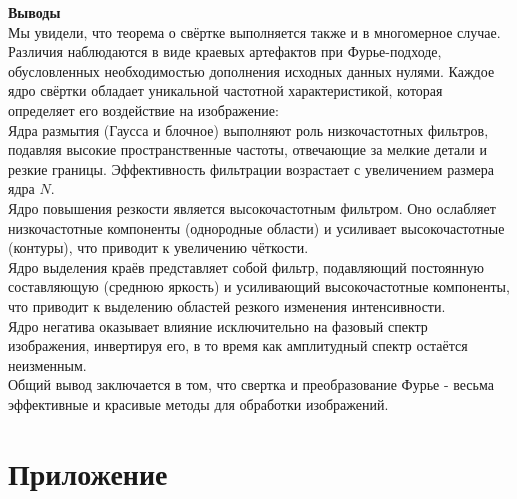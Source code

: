 \textbf{Выводы}\\
Мы увидели, что теорема о свёртке выполняется также и в многомерное случае.
Различия наблюдаются в виде краевых артефактов при Фурье-подходе, обусловленных необходимостью
дополнения исходных данных нулями.
Каждое ядро свёртки обладает уникальной частотной характеристикой, которая определяет его воздействие на изображение:\\
Ядра размытия (Гаусса и блочное) выполняют роль низкочастотных фильтров,
подавляя высокие пространственные частоты, отвечающие за мелкие детали и резкие границы.
Эффективность фильтрации возрастает с увеличением размера ядра $N$.\\
Ядро повышения резкости является высокочастотным фильтром. Оно ослабляет низкочастотные
компоненты (однородные области) и усиливает высокочастотные (контуры), что приводит к увеличению чёткости.\\
Ядро выделения краёв представляет собой фильтр, подавляющий постоянную
составляющую (среднюю яркость) и усиливающий высокочастотные компоненты, что приводит
к выделению областей резкого изменения интенсивности.\\
Ядро негатива оказывает влияние исключительно на фазовый спектр изображения, инвертируя
его, в то время как амплитудный спектр остаётся неизменным.\\
Общий вывод заключается в том, что свертка и преобразование Фурье - весьма эффективные и красивые методы для
обработки изображений.

\newpage
\section{Приложение}
\begin{code}
	\inputminted[breaklines=true, xleftmargin=1em, linenos, frame=single, framesep=10pt, fontsize=\tiny, firstline=1, lastline=638]{python}{/home/ns/Desktop/ITMO-courses/Fourier_Methods/Lab6/Lab6_listing.py}
	\caption{Листинг}
\end{code}